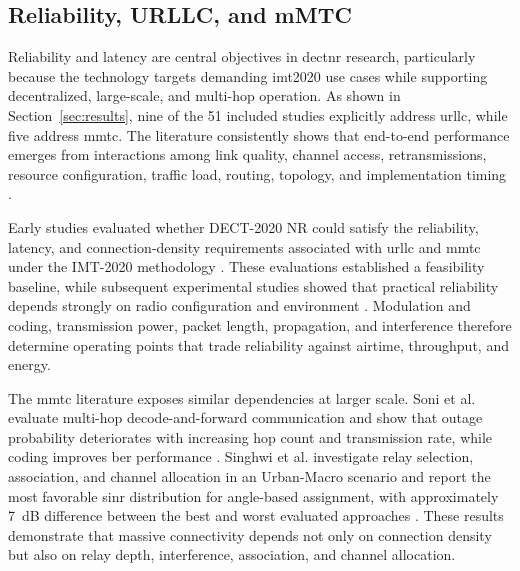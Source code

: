 \subsection{Reliability, URLLC, and mMTC}
\label{subsec:reliability}

Reliability and latency are central objectives in \gls{dectnr} research,
particularly because the technology targets demanding \gls{imt2020} use cases
while supporting decentralized, large-scale, and multi-hop operation. As shown
in Section~\ref{sec:results}, nine of the 51 included studies explicitly
address \gls{urllc}, while five address \gls{mmtc}. The literature consistently
shows that end-to-end performance emerges from interactions among link quality,
channel access, retransmissions, resource configuration, traffic load,
routing, topology, and implementation timing
\cite{maliatsosEvaluationIMT2020Candidate2022a,
smidaETSIDECT2020Component2023,
samuylovEmpoweringNearURLLCIoT2025}.

Early studies evaluated whether DECT-2020 NR could satisfy the reliability,
latency, and connection-density requirements associated with \gls{urllc} and
\gls{mmtc} under the IMT-2020 methodology
\cite{maliatsosEvaluationIMT2020Candidate2022a,
smidaETSIDECT2020Component2023,
pennerURLLCPerformanceEvaluation2021}. These evaluations established a
feasibility baseline, while subsequent experimental studies showed that
practical reliability depends strongly on radio configuration and environment
\cite{haqueDECT2020NRLink2025,
bandaraExperimentalValidationAnalysis2025,
grafParetoOptimalityApproach2026a}. Modulation and coding, transmission power,
packet length, propagation, and interference therefore determine operating
points that trade reliability against airtime, throughput, and energy.

The \gls{mmtc} literature exposes similar dependencies at larger scale. Soni
et al. evaluate multi-hop decode-and-forward communication and show that
outage probability deteriorates with increasing hop count and transmission
rate, while coding improves \gls{ber} performance
\cite{soniPerformanceMultihopAssisted2021}. Singhwi et al. investigate relay
selection, association, and channel allocation in an Urban-Macro scenario and
report the most favorable \gls{sinr} distribution for angle-based assignment,
with approximately 7~dB difference between the best and worst evaluated
approaches
\cite{singhwiDECT2020NewRadio2021}. These results demonstrate that massive
connectivity depends not only on connection density but also on relay depth,
interference, association, and channel allocation.

